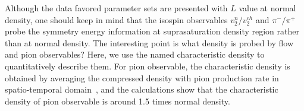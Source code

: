 \documentclass[reprint,aps,prc,twocolumn,superscriptaddress]{revtex4-1}
\begin{document}



Although the data favored parameter sets are presented with $L$ value at normal density, one should keep in mind that the isospin observables $v_2^{n}/v_2^{ch}$ and $\pi^-/\pi^+$ probe the symmetry energy information at suprasaturation density region rather than at normal density.
The interesting point is what density is probed by flow and pion observables? Here, we use the named characteristic density to quantitatively describe them. For pion observable, the characteristic density is obtained by averaging the compressed density with pion production rate in spatio-temporal domain~\cite{YYLiu2021PRC}, and the calculations show that the characteristic density of pion observable is around 1.5 times normal density.
\end{document}

